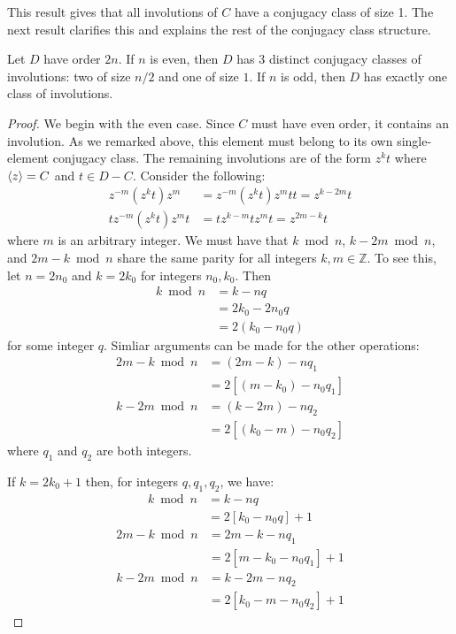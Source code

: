 \documentclass[main.tex]{subfiles}
\begin{document}
This result gives that all involutions of $C$ have a conjugacy class of size 1. The next result clarifies this and explains the rest of the conjugacy class structure.

\begin{proposition}
Let $D$ have order $2n$. If $n$ is even, then $D$ has 3 distinct conjugacy classes of involutions: two of size $n/2$ and one of size $1$. If $n$ is odd, then $D$ has exactly one class of involutions.
\end{proposition}

\begin{proof}
We begin with the even case. Since $C$ must have even order, it contains an involution. As we remarked above, this element must belong to its own single-element conjugacy class. The remaining involutions are of the form $z^k t$ where $\langle z \rangle = C$ and $t \in D - C$. Consider the following:
\begin{align*}
z^{-m} (z^k t) z^m &= z^{-m} (z^k t) z^m t t = z^{k-2m} t \\
t z^{-m} (z^k t) z^m t &= t z^{k-m} t z^m t= z^{2m-k} t
\end{align*}
where $m$ is an arbitrary integer. We must have that $k \bmod n$, $k-2m \bmod n$, and $2m-k \bmod n$ share the same parity for all integers $k,m \in \mathbb{Z}$.
To see this, let $n = 2n_0$ and $k = 2k_0$ for integers $n_0, k_0$. Then 
\begin{align*}
k \bmod n &= k - nq \\
&= 2k_0 - 2n_0 q  \\
&= 2(k_0 - n_0 q)
\end{align*}
 for some integer $q$. Simliar arguments can be made for the other operations:
\begin{align*}
2m - k \bmod n &= (2m-k) - n q_1 \\
&= 2[(m-k_0) - n_0 q_1 ]
\end{align*}
\begin{align*}
k - 2m \bmod n &= (k-2m) - n q_2\\
&= 2[(k_0-m) - n_0 q_2]
\end{align*}
where $q_1$ and $q_2$ are both integers.

If $k = 2k_0 + 1$ then, for integers $q, q_1, q_2$, we have:
\begin{align*}
k \bmod n &= k - n q \\
&= 2[k_0 - n_0 q] + 1
\end{align*}
\begin{align*}
2m - k \bmod n &= 2m - k - n q_1 \\
&= 2[m - k_0 - n_0 q_1] + 1
\end{align*}
\begin{align*}
k - 2m \bmod n &= k - 2m - n q_2 \\
&= 2[k_0 - m - n_0 q_2] + 1
\end{align*}


\end{proof}
\end{document}
